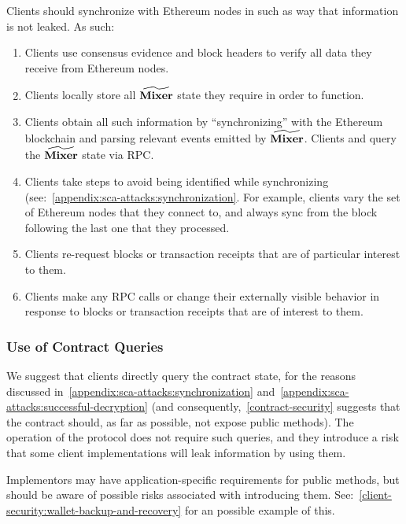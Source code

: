 Clients should synchronize with Ethereum nodes in such as way that information is not leaked. As such:
\begin{enumerate}
    \item Clients \MUST{} use consensus evidence and block headers to verify all data they receive from Ethereum nodes.
    \item Clients \MUST{} locally store all $\widetilde{\mathbf{Mixer}}$ state they require in order to function.
    \item Clients \MUST{} obtain all such information by ``synchronizing'' with the Ethereum blockchain and parsing relevant events emitted by $\widetilde{\mathbf{Mixer}}$. Clients and \MUSTNOT{} query the $\widetilde{\mathbf{Mixer}}$ state via RPC.
    \item Clients \SHOULD{} take steps to avoid being identified while synchronizing (see:~\cref{appendix:sca-attacks:synchronization}. For example, clients \SHOULD{} vary the set of Ethereum nodes that they connect to, and \SHOULDNOT{} always sync from the block following the last one that they processed.
    \item Clients \SHOULDNOT{} re-request blocks or transaction receipts that are of particular interest to them.
    \item Clients \SHOULDNOT{} make any RPC calls or change their externally visible behavior in response to blocks or transaction receipts that are of interest to them.
\end{enumerate}

\subsubsection{Use of Contract Queries}\label{client-security:syncing:client-queries}

We suggest that clients \SHOULDNOT{} directly query the contract state, for the reasons discussed in~\cref{appendix:sca-attacks:synchronization} and~\cref{appendix:sca-attacks:successful-decryption} (and consequently,~\cref{contract-security} suggests that the \mixer{} contract should, as far as possible, not expose public methods). The operation of the protocol does not require such queries, and they introduce a risk that some client implementations will leak information by using them.

Implementors may have application-specific requirements for public \mixer{} methods, but should be aware of possible risks associated with introducing them. See:~\cref{client-security:wallet-backup-and-recovery} for an possible example of this.

